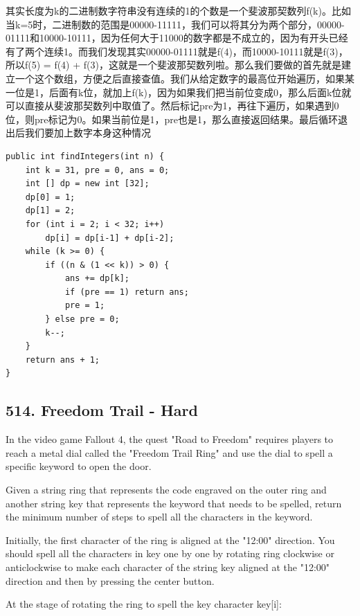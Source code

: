 \documentclass[9pt, b5paaper]{book}
\begin{document}
\begin{enumerate}
其实长度为k的二进制数字符串没有连续的1的个数是一个斐波那契数列f(k)。比如当k=5时，二进制数的范围是00000-11111，我们可以将其分为两个部分，00000-01111和10000-10111，因为任何大于11000的数字都是不成立的，因为有开头已经有了两个连续1。而我们发现其实00000-01111就是f(4)，而10000-10111就是f(3)，所以f(5) = f(4) + f(3)，这就是一个斐波那契数列啦。那么我们要做的首先就是建立一个这个数组，方便之后直接查值。我们从给定数字的最高位开始遍历，如果某一位是1，后面有k位，就加上f(k)，因为如果我们把当前位变成0，那么后面k位就可以直接从斐波那契数列中取值了。然后标记pre为1，再往下遍历，如果遇到0位，则pre标记为0。如果当前位是1，pre也是1，那么直接返回结果。最后循环退出后我们要加上数字本身这种情况

\begin{verbatim}
public int findIntegers(int n) {
    int k = 31, pre = 0, ans = 0;
    int [] dp = new int [32];
    dp[0] = 1;
    dp[1] = 2;
    for (int i = 2; i < 32; i++) 
        dp[i] = dp[i-1] + dp[i-2];
    while (k >= 0) {
        if ((n & (1 << k)) > 0) {
            ans += dp[k];
            if (pre == 1) return ans;
            pre = 1;
        } else pre = 0;
        k--;
    }
    return ans + 1;
}
\end{verbatim}
\end{enumerate}

\subsection{514. Freedom Trail - Hard}
\label{sec-1-4-16}
In the video game Fallout 4, the quest "Road to Freedom" requires players to reach a metal dial called the "Freedom Trail Ring" and use the dial to spell a specific keyword to open the door.

Given a string ring that represents the code engraved on the outer ring and another string key that represents the keyword that needs to be spelled, return the minimum number of steps to spell all the characters in the keyword.

Initially, the first character of the ring is aligned at the "12:00" direction. You should spell all the characters in key one by one by rotating ring clockwise or anticlockwise to make each character of the string key aligned at the "12:00" direction and then by pressing the center button.

At the stage of rotating the ring to spell the key character key[i]:
\end{document}
